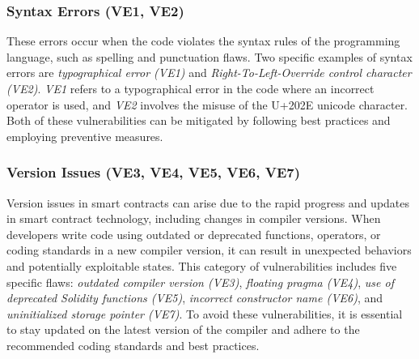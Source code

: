 \documentclass[manuscript,screen]{acmart}
\begin{document}
\subsubsection{Syntax Errors (VE1, VE2)}
These errors occur when the code violates the syntax rules of the programming language, such as spelling and punctuation flaws. Two specific examples of syntax errors are \textit{typographical error (VE1)} and \textit{Right-To-Left-Override control character (VE2)}. \textit{VE1} refers to a typographical error in the code where an incorrect operator is used, and \textit{VE2} involves the misuse of the U+202E unicode character. Both of these vulnerabilities can be mitigated by following best practices and employing preventive measures. 

\subsubsection{Version Issues (VE3, VE4, VE5, VE6, VE7)} 
Version issues in smart contracts can arise due to the rapid progress and updates in smart contract technology, including changes in compiler versions. When developers write code using outdated or deprecated functions, operators, or coding standards in a new compiler version, it can result in unexpected behaviors and potentially exploitable states. This category of vulnerabilities includes five specific flaws: \textit{outdated compiler version (VE3)}, \textit{floating pragma (VE4)}, \textit{use of deprecated Solidity functions (VE5)}, \textit{incorrect constructor name (VE6)}, and \textit{uninitialized storage pointer (VE7)}. To avoid these vulnerabilities, it is essential to stay updated on the latest version of the compiler and adhere to the recommended coding standards and best practices. 
\end{document}
